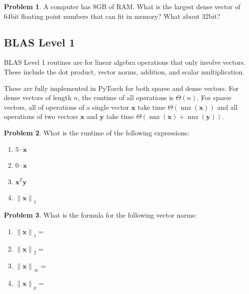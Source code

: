 \documentclass[10pt]{article}
\theoremstyle{definition}
\newtheorem{problem}{Problem}
\DeclareMathOperator{\nnz}{nnz}
\newcommand{\trans}[1]{{#1}^{T}}
\newcommand{\x}{\mathbf x}
\newcommand{\y}{\mathbf y}
\newcommand{\lone}[1]{{\lVert {#1} \rVert}_1}
\newcommand{\ltwo}[1]{{\lVert {#1} \rVert}_2}
\newcommand{\lp}[1]{{\lVert {#1} \rVert}_p}
\newcommand{\linf}[1]{{\lVert {#1} \rVert}_\infty}
\begin{document}
\newpage
\begin{problem}
    A computer has 8GB of RAM.
    What is the largest dense vector of 64bit floating point numbers that can fit in memory?
    What about 32bit?
    \vspace{4in}
\end{problem}

\newpage
\subsection{BLAS Level 1}

BLAS Level 1 routines are for linear algebra operations that only involve vectors.
These include the dot product, vector norms, addition, and scalar multiplication.

These are fully implemented in PyTorch for both sparse and dense vectors.
For dense vectors of length $n$, the runtime of all operations is $\Theta(n)$.
For sparse vectors, all of operations of a single vector $\x$ take time $\Theta(\nnz(\x))$
and all operations of two vectors $\x$ and $\y$ take time $\Theta(\nnz(\x)+\nnz(\y))$.

\begin{problem}
    What is the runtime of the following expressions:
    \begin{enumerate}
        \item $5 \cdot \x$
            \vspace{2in}
        \item $0 \cdot \x$
            \vspace{2in}
        \item $\trans\x \y$
            \vspace{2in}
        \item $\lone{\x}$
            \vspace{2in}
    \end{enumerate}
\end{problem}

\begin{problem}
    What is the formula for the following vector norms:
    \begin{enumerate}
        \item $\lone{\x}=$
            \vspace{2in}
        \item $\ltwo{\x}=$
            \vspace{2in}
        \item $\linf{\x}=$
            \vspace{2in}
        \item $\lp{\x}=$
            \vspace{2in}
    \end{enumerate}
\end{problem}
\end{document}
